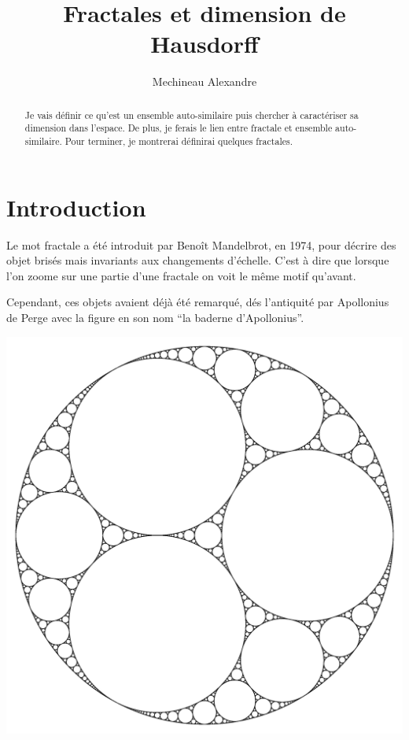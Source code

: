 \documentclass[a4paper, 12pt]{report}
\title{ \bf Fractales et dimension de Hausdorff}
\author{Mechineau Alexandre}
\begin{document}
	\newtheorem{definition}{Définition}
	\newtheorem{prop}{Proposition}
	\newtheorem{theorem}{Théorème}
	\newtheorem*{remark*}{Remarque}
	\newtheorem{lemma}{Lemme}
	
	
	\maketitle
	
	\begin{abstract}
		Je vais définir ce qu'est un ensemble auto-similaire puis chercher à caractériser sa dimension dans l'espace. De plus, je ferais le lien entre fractale et ensemble auto-similaire. Pour terminer, je montrerai définirai quelques fractales.
	\end{abstract}
	
	\tableofcontents
	
	\chapter{\bf Introduction}
		
		Le mot fractale a été introduit par Benoît Mandelbrot, en 1974, pour décrire des objet brisés mais invariants aux changements d'échelle. C'est à dire que lorsque l'on zoome sur une partie d'une fractale on voit le même motif qu'avant.
		
		Cependant, ces objets avaient déjà été remarqué, dés l'antiquité par Apollonius de Perge avec la figure en son nom ``la baderne d'Apollonius''.
		\begin{center}
			\includegraphics[scale=0.1]{Images/baderne}
		\end{center}
		
\end{document}
